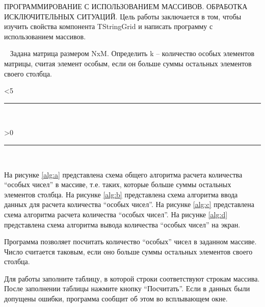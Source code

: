 

 {ПРОГРАММИРОВАНИЕ С ИСПОЛЬЗОВАНИЕМ МАССИВОВ. ОБРАБОТКА ИСКЛЮЧИТЕЛЬНЫХ СИТУАЦИЙ.}
\setcounter{page}{2}
\normalfont
{}
Цель работы заключается в том, чтобы изучить свойства компонента TStringGrid и написать программу с использованием массивов.

\ 
Задана  матрица  размером  NxM.  Определить  k  –  количество  особых
элементов  матрицы,  считая  элемент  особым,  если  он  больше  суммы  остальных 
элементов своего столбца. 

\clearpage
{}
{
\loop{}\ifnum\thepage<5{\hrule\hfill\\}\repeat
{}\setcounter{lc}{29}
\loop{}\ifnum\value{lc}>0{\addtocounter{lc}{-1}\hrule\hfill\\}\repeat
}
На рисунке \ref{alg:a} представлена схема общего алгоритма расчета количества ``особых чисел'' в массиве, т.е. таких,
которые больше суммы остальных элементов столбца.
На рисунке \ref{alg:b} представлена схема алгоритма ввода данных для  расчета количества ``особых чисел''.
На рисунке \ref{alg:c} представлена схема алгоритма расчета  количества ``особых чисел''.
На рисунке \ref{alg:d} представлена схема алгоритма вывода  количества ``особых чисел'' на экран.

\clearpage
{}
Программа позволяет посчитать количество ``особых'' чисел в заданном массиве. Число считается таковым, если оно больше суммы остальных элементов своего столбца.

Для работы заполните таблицу, в которой строки соответствуют строкам массива. После заполнении таблицы нажмите кнопку  ``Посчитать''.   Если в данных были допущены ошибки, программа сообщит об этом во всплывающем окне.

